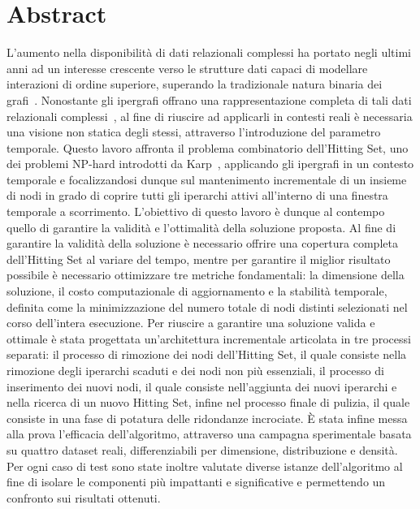 
\chapter*{Abstract}\label{cha:abtract}

L'aumento nella disponibilità di dati relazionali complessi ha portato negli ultimi anni ad un interesse crescente verso le strutture dati capaci di modellare interazioni di ordine superiore, superando la tradizionale natura binaria dei grafi~\cite{battiston2020, antelmi2023}.
Nonostante gli ipergrafi offrano una rappresentazione completa di tali dati relazionali complessi~\cite{bretto2013}, al fine di riuscire ad applicarli in contesti reali è necessaria una visione non statica degli stessi, attraverso l'introduzione del parametro temporale.
Questo lavoro affronta il problema combinatorio dell'Hitting Set, uno dei problemi NP-hard introdotti da Karp~\cite{karp1972}, applicando gli ipergrafi in un contesto temporale e focalizzandosi dunque sul mantenimento incrementale di un insieme di nodi in grado di coprire tutti gli iperarchi attivi all'interno di una finestra temporale a scorrimento.
L'obiettivo di questo lavoro è dunque al contempo quello di garantire la validità e l'ottimalità della soluzione proposta.
Al fine di garantire la validità della soluzione è necessario offrire una copertura completa dell'Hitting Set al variare del tempo, mentre per garantire il miglior risultato possibile è necessario ottimizzare tre metriche fondamentali: la dimensione della soluzione, il costo computazionale di aggiornamento e la stabilità temporale, definita come la minimizzazione del numero totale di nodi distinti selezionati nel corso dell'intera esecuzione.
Per riuscire a garantire una soluzione valida e ottimale è stata progettata un'architettura incrementale articolata in tre processi separati: il processo di rimozione dei nodi dell'Hitting Set, il quale consiste nella rimozione degli iperarchi scaduti e dei nodi non più essenziali, il processo di inserimento dei nuovi nodi, il quale consiste nell'aggiunta dei nuovi iperarchi e nella ricerca di un nuovo Hitting Set, infine nel processo finale di pulizia, il quale consiste in una fase di potatura delle ridondanze incrociate.
È stata infine messa alla prova l'efficacia dell'algoritmo, attraverso una campagna sperimentale basata su quattro dataset reali, differenziabili per dimensione, distribuzione e densità.
Per ogni caso di test sono state inoltre valutate diverse istanze dell'algoritmo al fine di isolare le componenti più impattanti e significative e permettendo un confronto sui risultati ottenuti.
